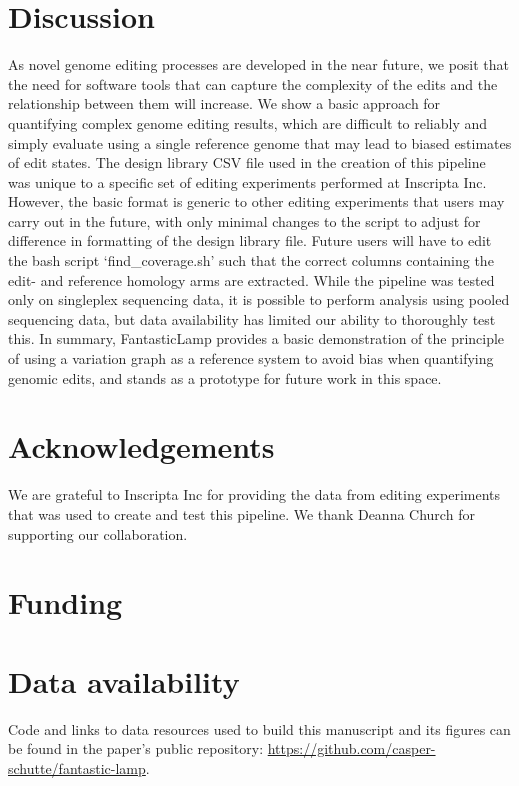 \documentclass{bioinfo}
\theoremstyle{definition}
\begin{document}
\section{Discussion}
\label{sec:discussion}
As novel genome editing processes are developed in the near future, we posit that the need for software tools that can capture the complexity of the edits and the relationship between them will increase.
We show a basic approach for quantifying complex genome editing results, which are difficult to reliably and simply evaluate using a single reference genome that may lead to biased estimates of edit states.
The design library CSV file used in the creation of this pipeline was unique to a specific set of editing experiments performed at Inscripta Inc.
However, the basic format is generic to other editing experiments that users may carry out in the future, with only minimal changes to the script to adjust for difference in formatting of the design library file.
Future users will have to edit the bash script `find\_coverage.sh' such that the correct columns containing the edit- and reference homology arms are extracted.
While the pipeline was tested only on singleplex sequencing data, it is possible to perform analysis using pooled sequencing data, but data availability has limited our ability to thoroughly test this.
In summary, FantasticLamp provides a basic demonstration of the principle of using a variation graph as a reference system to avoid bias when quantifying genomic edits, and stands as a prototype for future work in this space.
\section*{Acknowledgements}
We are grateful to Inscripta Inc for providing the data from editing experiments that was used to create and test this pipeline. We thank Deanna Church for supporting our collaboration.

\section*{Funding}

\section*{Data availability}
Code and links to data resources used to build this manuscript and its figures can be found in the paper's public repository: \url{https://github.com/casper-schutte/fantastic-lamp}.




\end{document}
